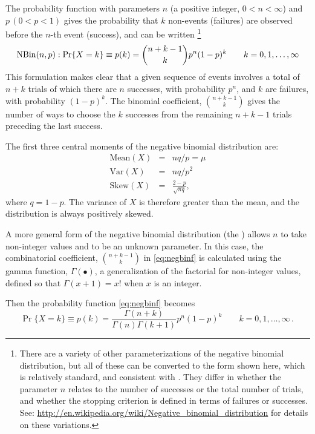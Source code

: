 \documentclass[10pt,krantz2]{krantz}\usepackage[]{graphicx}\usepackage[]{color}
\begin{document}
The probability function with parameters $n$ (a positive integer, $0 < n < \infty$) and $p \, (0 < p < 1)$
gives the probability that $k$ non-events (failures) are observed before
the $n$-th event (success), and
can be written%
\footnote{
There are a variety of other parameterizations of the negative binomial distribution,
but all of these can be converted to the form shown here, which is relatively
standard, and consistent with \R. They differ in whether the parameter $n$
relates to the number of successes or the total number of trials, and
whether the stopping criterion is defined in terms of failures or successes.
See: \url{http://en.wikipedia.org/wiki/Negative_binomial_distribution}
for details on these variations.
}
\begin{equation}\label{eq:negbinf}
\NBin(n,p):   \Pr \{ X = k \} \equiv p(k)  =
  {n+k-1 \choose k} p^n (1-p)^k
  \quad\quad k = 0, 1, \dots , \infty
\end{equation}
This formulation makes clear that a given sequence of events involves
a total of $n+k$ trials of which there are $n$ successes,
with probability $p^n$, and $k$ are failures, with probability $(1-p)^k$.
The binomial coefficient, ${n+k-1 \choose k}$ gives the number of ways
to choose the $k$ successes from the remaining $n+k-1$ trials preceding
the last success.

The first three central moments of the negative binomial distribution are:
\begin{eqnarray*}
\textrm{Mean}(X) &=&nq / p  = \mu \\
\textrm{Var}(X) &=&nq / p^2 \\
\textrm{Skew}(X) &=&\frac{2-p}{\sqrt{nq}}
\comma
\end{eqnarray*}
where $q=1-p$. The variance of $X$ is therefore greater than the mean,
and the distribution is always positively skewed.

A more general form of the negative binomial distribution
(the )
allows $n$ to take non-integer values and to be an unknown
parameter.
In this case, the combinatorial coefficient,
${n+k-1 \choose k}$ in \eqref{eq:negbinf} is calculated using
the gamma function, $\Gamma(\bullet)$,
a generalization of the factorial for non-integer values,
defined so that $\Gamma(x+1) = x!$ when $x$ is an integer.

Then the probability function \eqref{eq:negbinf} becomes
\begin{equation}\label{eq:negbinf2}
  \Pr \{ X = k \} \equiv p(k)  =
  \frac{\Gamma(n+k)}{\Gamma(n) \Gamma(k+1)}
   p^n (1-p)^k
  \quad\quad k = 0, 1, \dots , \infty
  \period
\end{equation}
\end{document}
